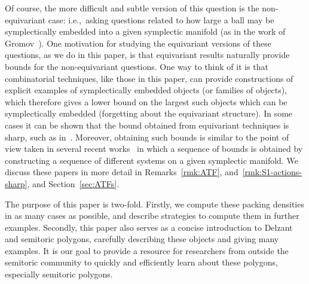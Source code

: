 \documentclass[pdftex]{sigma}
\numberwithin{equation}{section}
\begin{document}
Of course, the more difficult and subtle version of this question is the non-equivariant case: i.e.,~asking questions related to how large a ball may be symplectically embedded into a given symplectic manifold (as in the work of Gromov~\cite{Gromov1985}). One motivation for studying the equivariant versions of these questions, as we do in this paper, is that equivariant results naturally provide bounds for the non-equivariant questions. One way to think of it is that combinatorial techniques, like those in this paper, can provide constructions of explicit examples of symplectically embedded objects (or families of objects), which therefore gives a lower bound on the largest such objects which can be symplectically embedded (forgetting about the equivariant structure).
In some cases it can be shown that the bound obtained from equivariant techniques is sharp, such as in~\cite{HS17}.
Moreover, obtaining such bounds is similar to the point of view taken in several recent works~\cite{CGHMP,CV,four-periodic,macgill,MMW-staircasepatterns} in which a sequence of bounds is obtained by constructing a sequence of different systems on a given symplectic manifold. We discuss these papers in more detail in Remarks~\ref{rmk:ATF}, and~\ref{rmk:S1-actions-sharp}, and Section~\ref{sec:ATFs}.

The purpose of this paper is two-fold. Firstly, we compute these packing densities in as many cases as possible, and describe strategies to compute them in further examples.
Secondly, this paper also serves as a concise introduction to Delzant and semitoric polygons, carefully describing these objects and giving many examples. It is our goal to provide a resource for researchers from outside the semitoric community to quickly and efficiently learn about these polygons, especially semitoric polygons.
\end{document}
